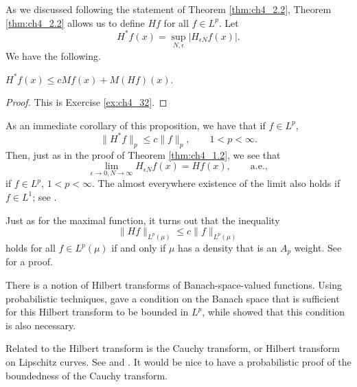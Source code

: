 \mpagebreak


As we discussed following the statement of Theorem \ref{thm:ch4_2.2}, Theorem \ref{thm:ch4_2.2} allows us to define $Hf$ for all $f \in L^p$. Let
\begin{equation}\label{eq:ch4_2.12}
    H^*f(x) = \sup_{N,\epsilon} |H_{\epsilon N}f(x)|.
\end{equation}
We have the following.

\begin{proposition}\label{prop:ch4_2.5}
$H^*f(x) \leq cMf(x) + M(Hf)(x)$.
\end{proposition}

\begin{proof}
This is Exercise \ref{ex:ch4_32}.
\end{proof}

As an immediate corollary of this proposition, we have that if $f \in L^p$,
\begin{equation}\label{eq:ch4_2.13}
    \|H^*f\|_p \leq c\|f\|_p, \qquad 1 < p < \infty.
\end{equation}
Then, just as in the proof of Theorem \ref{thm:ch4_1.2}, we see that
\begin{equation}\label{eq:ch4_2.14}
    \lim_{\epsilon\to 0,N\to\infty} H_{\epsilon N}f(x) = Hf(x), \qquad \text{a.e.},
\end{equation}
if $f \in L^p$, $1 < p < \infty$. The almost everywhere existence of the limit also holds if $f \in L^1$; see \cite{Stein1970a}.

Just as for the maximal function, it turns out that the inequality
\[
    \|Hf\|_{L^p(\mu)} \leq c\|f\|_{L^p(\mu)}
\]
holds for all $f \in L^p(\mu)$ if and only if $\mu$ has a density that is an $A_p$ weight. See \cite{Garnett1981} for a proof.

There is a notion of Hilbert transforms of Banach-space-valued functions. Using probabilistic techniques, \cite{Burkholder1983} gave a condition on the Banach space that is sufficient for this Hilbert transform to be bounded in $L^p$, while \cite{Bourgain1983} showed that this condition is also necessary.

Related to the Hilbert transform is the Cauchy transform, or Hilbert transform on Lipschitz curves. See \cite{Stein1993} and \cite{CoifmanJonesSemmes1989}. It would be nice to have a probabilistic proof of the boundedness of the Cauchy transform.

